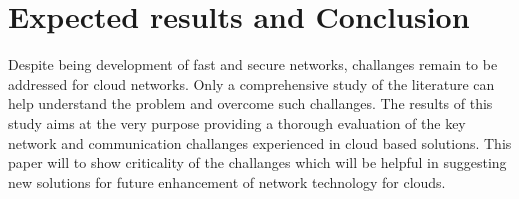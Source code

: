 
\section{Expected results and Conclusion}

Despite being development of fast and secure networks, challanges remain to be addressed for cloud networks. Only a comprehensive study of the literature can help understand the problem and overcome such challanges. The results of this study aims at the very purpose providing a thorough evaluation of the key network and communication challanges experienced in cloud based solutions. This paper will to show criticality of the challanges which will be helpful in suggesting new solutions for future enhancement of network technology for clouds.  


